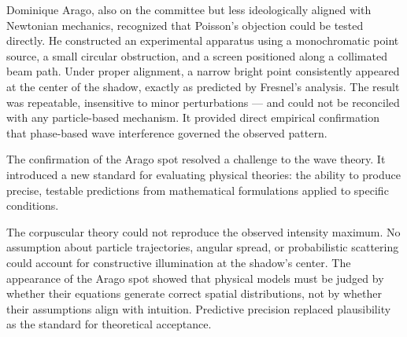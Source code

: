 Dominique Arago, also on the committee but less ideologically aligned with Newtonian mechanics, recognized that Poisson's objection could be tested directly. He constructed an experimental apparatus using a monochromatic point source, a small circular obstruction, and a screen positioned along a collimated beam path. Under proper alignment, a narrow bright point consistently appeared at the center of the shadow, exactly as predicted by Fresnel's analysis. The result was repeatable, insensitive to minor perturbations — and could not be reconciled with any particle-based mechanism. It provided direct empirical confirmation that phase-based wave interference governed the observed pattern.

The confirmation of the Arago spot resolved a challenge to the wave theory. It introduced a new standard for evaluating physical theories: the ability to produce precise, testable predictions from mathematical formulations applied to specific conditions.

The corpuscular theory could not reproduce the observed intensity maximum. No assumption about particle trajectories, angular spread, or probabilistic scattering could account for constructive illumination at the shadow's center. The appearance of the Arago spot showed that physical models must be judged by whether their equations generate correct spatial distributions, not by whether their assumptions align with intuition. Predictive precision replaced plausibility as the standard for theoretical acceptance.

